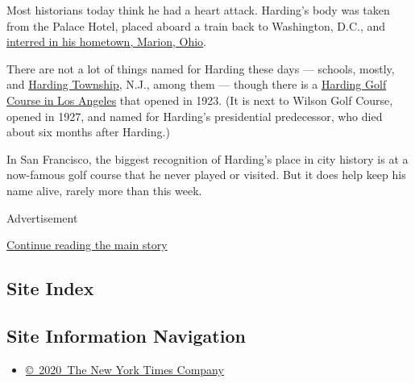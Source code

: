 Most historians today think he had a heart attack. Harding's body was
taken from the Palace Hotel, placed aboard a train back to Washington,
D.C., and
\href{https://www.ohiohistory.org/visit/museum-and-site-locator/warren-g-harding-home-memorial}{interred
in his hometown, Marion, Ohio}.

There are not a lot of things named for Harding these days --- schools,
mostly, and
\href{https://www.nytimes.com/2019/03/27/realestate/harding-township-nj-a-historic-place-that-feels-like-the-country.html}{Harding
Township}, N.J., among them --- though there is a
\href{https://www.golf.lacity.org/course_harding/}{Harding Golf Course
in Los Angeles} that opened in 1923. (It is next to Wilson Golf Course,
opened in 1927, and named for Harding's presidential predecessor, who
died about six months after Harding.)

In San Francisco, the biggest recognition of Harding's place in city
history is at a now-famous golf course that he never played or visited.
But it does help keep his name alive, rarely more than this week.

Advertisement

\protect\hyperlink{after-bottom}{Continue reading the main story}

\hypertarget{site-index}{%
\subsection{Site Index}\label{site-index}}

\hypertarget{site-information-navigation}{%
\subsection{Site Information
Navigation}\label{site-information-navigation}}

\begin{itemize}
\tightlist
\item
  \href{https://help.nytimes.com/hc/en-us/articles/115014792127-Copyright-notice}{©~2020~The
  New York Times Company}
\end{itemize}

